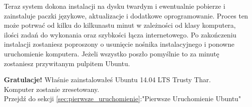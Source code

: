 Teraz system dokona instalacji na dysku twardym i ewentualnie pobierze i zainstaluje paczki językowe, aktualizacje i dodatkowe oprogramowanie. Proces ten może potrwać od kilku do kilkunastu minut w zależności od klasy komputera, ilości zadań do wykonania oraz szybkości łącza internetowego.
Po zakończeniu instalacji zostaniesz poproszony o usunięcie nośnika instalacyjnego i ponowne uruchomienie komputera. Jeżeli wszystko poszło pomyślnie to za minutę zostaniesz przywitanym pulpitem Ubuntu.
\begin{flushright}
\textbf{Gratulacje!} Właśnie zainstalowałeś Ubuntu 14.04 LTS Trusty Thar.\\
Komputer zostanie zresetowany.\\
Przejdź do sekcji \ref{sec:pierwsze_uruchomienie}:"Pierwsze Uruchomienie Ubuntu"
\end{flushright}
\clearpage
